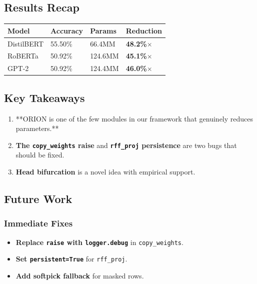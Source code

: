 \subsection{Results Recap}

\begin{table}[H]
\centering
\small
\begin{tabular}{llll}
\toprule
\textbf{Model} & \textbf{Accuracy} & \textbf{Params} & \textbf{Reduction} \\
\midrule
DistilBERT & 55.50\% & 66.4MM & \textbf{48.2\%$\times$} \\
RoBERTa & 50.92\% & 124.6MM & \textbf{45.1\%$\times$} \\
GPT-2 & 50.92\% & 124.4MM & \textbf{46.0\%$\times$} \\
\bottomrule
\end{tabular}
\end{table}

\subsection{Key Takeaways}

\begin{enumerate}
\item **ORION is one of the few modules in our framework that genuinely
  reduces parameters.**
\item \textbf{The \texttt{copy\_weights} raise} and \textbf{\texttt{rff\_proj} persistence} are two
  bugs that should be fixed.
\item \textbf{Head bifurcation} is a novel idea with empirical support.

\end{enumerate}
\subsection{Future Work}

\subsubsection{Immediate Fixes}

\begin{itemize}
\item \textbf{Replace \texttt{raise} with \texttt{logger.debug}} in \texttt{copy\_weights}.
\item \textbf{Set \texttt{persistent=True}} for \texttt{rff\_proj}.
\item \textbf{Add softpick fallback} for masked rows.

\end{itemize}
